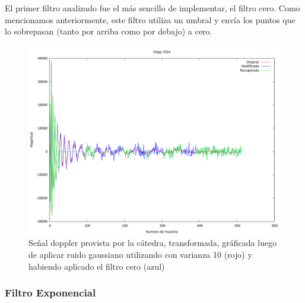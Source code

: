 El primer filtro analizado fue el m\'as sencillo de implementar, el filtro cero.
Como mencionamos anteriormente, este filtro utiliza un umbral y env\'ia los
puntos que lo sobrepasan (tanto por arriba como por debajo) a cero.

\begin{figure}[H]
\begin {center}
\includegraphics[width=500pt]{imagenes/dopp1024-gauss-10-zero.png}
\end {center}
\caption{Se\~nal doppler provista por la c\'atedra, transformada, gr\'aficada
luego de aplicar ruido gaussiano utilizando con varianza 10 (rojo) y 
habiendo aplicado el filtro cero (azul)}
\label{fig:Dopp1024zero}
\end{figure}


\subsubsection{Filtro Exponencial}




